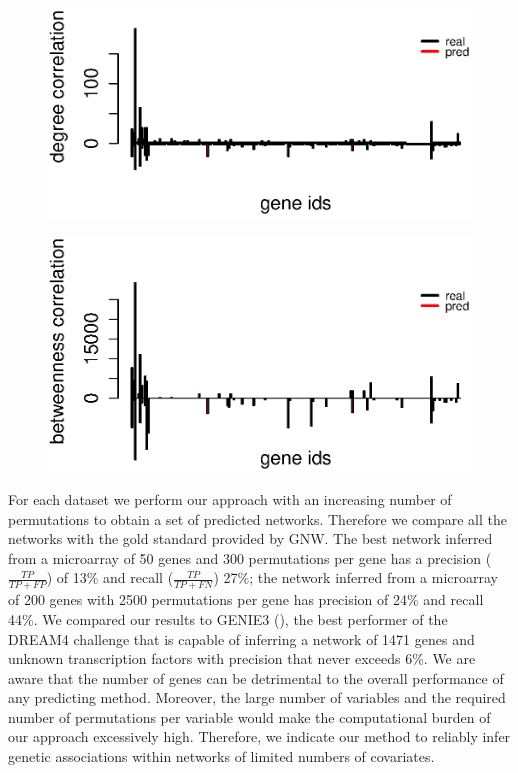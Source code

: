 \begin{figure} 
\noindent\begin{minipage}{.5\textwidth}
\centering
  \includegraphics[width=1\linewidth]{degree_barplot.eps}
  \label{fig:degree}
\end{minipage}
\noindent\begin{minipage}{.5\textwidth}
  \includegraphics[width=1\linewidth]{between_barplot.eps}
  \label{fig:between}
\end{minipage}
\end{figure}


For each dataset we perform our approach with an increasing number of permutations to obtain a set of predicted networks. Therefore we compare all the networks with the gold standard provided by GNW. 
The best network inferred from a microarray of 50 genes and 300 permutations per gene has a precision ($\frac{TP}{TP+FP}$) of 13\% and recall ($\frac{TP}{TP+FN}$) 27\%; the network inferred from a microarray of 200 genes with 2500 permutations per gene has precision of 24\% and recall 44\%. 
We compared our results to GENIE3 (\citealp{genie3}), the best performer of the DREAM4 challenge that is capable of inferring a network of 1471 genes and unknown transcription factors with precision that never exceeds 6\%.
We are aware that the number of genes can be detrimental to the overall performance of any predicting method. Moreover, the large number of variables and the required number of permutations per variable would make the computational burden of our approach excessively high. Therefore, we indicate our method to reliably infer genetic associations within networks of limited numbers of covariates.

